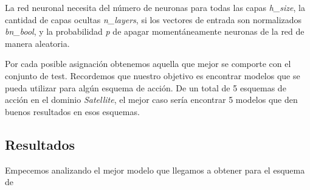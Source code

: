 La red neuronal necesita del número de neuronas para todas las capas
\emph{h\_size}, la cantidad de capas ocultas \emph{n\_layers}, si los vectores
de entrada son normalizados \emph{bn\_bool}, y la probabilidad  \emph{p} de apagar momentáneamente neuronas de la red de manera
aleatoria.

Por cada posible asignación obtenemos aquella que mejor se comporte con el conjunto de test. Recordemos que nuestro objetivo es encontrar modelos que se pueda utilizar para algún esquema de acción. De un total de 5 esquemas de acción en el dominio \emph{Satellite}, el mejor caso sería encontrar 5 modelos que den buenos resultados en esos esquemas.

\subsection{Resultados}

Empecemos analizando el mejor modelo que llegamos a obtener para el esquema de \emph{}



